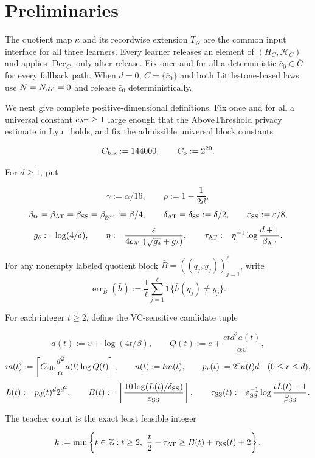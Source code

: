 \section{Preliminaries}

The quotient map $\kappa$ and its recordwise extension $T_N$ are the common
input interface for all three learners.  Every learner releases an element of
$(H_C,\mathcal H_C)$ and applies $\operatorname{Dec}_C$ only after release.
Fix once and for all a deterministic $\bar c_0\in\bar C$ for every fallback
path.  When $d=0$, $\bar C=\{\bar c_0\}$ and both Littlestone-based laws use
$N=N_{\rm old}=0$ and release $\bar c_0$ deterministically.

We next give complete positive-dimensional definitions.  Fix once and for
all a universal constant $c_{\rm AT}\ge1$ large enough that the
AboveThreshold privacy estimate in Lyu~\citep[Lemma~3.2]{lyu2025} holds,
and fix the admissible universal block constants

\[
 C_{\rm blk}:=144000,
 \qquad C_{\rm o}:=2^{20}.
\]

For $d\ge1$, put

\[
 \gamma:=\alpha/16,
 \qquad
 \rho:=1-\frac{1}{2d},
\]
\[
 \beta_{\rm tr}=\beta_{\rm AT}=\beta_{\rm SS}=\beta_{\rm gen}:=\beta/4,
 \qquad
 \delta_{\rm AT}=\delta_{\rm SS}:=\delta/2,
 \qquad \varepsilon_{\rm SS}:=\varepsilon/8,
\]
\[
 g_\delta:=\log(4/\delta),
 \qquad
 \eta:=\frac{\varepsilon}
 {4c_{\rm AT}(\sqrt{g_\delta}+g_\delta)},
 \qquad
 \tau_{\rm AT}:=\eta^{-1}\log\frac{d+1}{\beta_{\rm AT}}.
\]

For any nonempty labeled quotient block
$\bar B=((q_j,y_j))_{j=1}^{\ell}$, write
\[
 \operatorname{err}_{\bar B}(\bar h)
 :=\frac1\ell\sum_{j=1}^{\ell}
 \mathbf1\{\bar h(q_j)\ne y_j\}.
\]

For each integer $t\ge2$, define the VC-sensitive candidate tuple

\[
 a(t):=v+\log(4t/\beta),
 \qquad
 Q(t):=e+\frac{etd^2a(t)}{\alpha v},
\]
\[
 m(t):=\left\lceil C_{\rm blk}\frac{d^2}{\alpha}
 a(t)\log Q(t)\right\rceil,
 \qquad n(t):=tm(t),
 \qquad p_r(t):=2^rn(t)d\quad(0\le r\le d),
\]
\[
 L(t):=p_d(t)^d2^{d^2},
 \qquad
 B(t):=\left\lceil
 \frac{10\log(L(t)/\delta_{\rm SS})}{\varepsilon_{\rm SS}}
 \right\rceil,
 \qquad
 \tau_{\rm SS}(t):=\varepsilon_{\rm SS}^{-1}
 \log\frac{tL(t)+1}{\beta_{\rm SS}}.
\]

The teacher count is the exact least feasible integer

\[
 k:=\min\left\{t\in\mathbb Z:t\ge2,
 \ \frac t2-\tau_{\rm AT}\ge B(t)+\tau_{\rm SS}(t)+2\right\}.
\]

